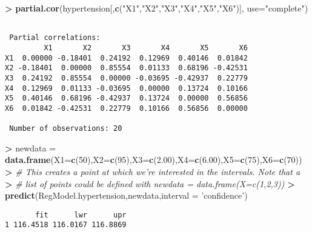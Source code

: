 \documentclass[]{article}
\newenvironment{Shaded}{\begin{snugshade}}{\end{snugshade}}
\newcommand{\KeywordTok}[1]{\textcolor[rgb]{0.13,0.29,0.53}{\textbf{#1}}}
\newcommand{\DataTypeTok}[1]{\textcolor[rgb]{0.13,0.29,0.53}{#1}}
\newcommand{\DecValTok}[1]{\textcolor[rgb]{0.00,0.00,0.81}{#1}}
\newcommand{\FloatTok}[1]{\textcolor[rgb]{0.00,0.00,0.81}{#1}}
\newcommand{\StringTok}[1]{\textcolor[rgb]{0.31,0.60,0.02}{#1}}
\newcommand{\CommentTok}[1]{\textcolor[rgb]{0.56,0.35,0.01}{\textit{#1}}}
\newcommand{\OperatorTok}[1]{\textcolor[rgb]{0.81,0.36,0.00}{\textbf{#1}}}
\newcommand{\ErrorTok}[1]{\textcolor[rgb]{0.64,0.00,0.00}{\textbf{#1}}}
\newcommand{\NormalTok}[1]{#1}
\begin{document}
\begin{Shaded}
\begin{Highlighting}[]
\OperatorTok{>}\StringTok{ }\KeywordTok{partial.cor}\NormalTok{(hypertension[,}\KeywordTok{c}\NormalTok{(}\StringTok{"X1"}\NormalTok{,}\StringTok{"X2"}\NormalTok{,}\StringTok{"X3"}\NormalTok{,}\StringTok{"X4"}\NormalTok{,}\StringTok{"X5"}\NormalTok{,}\StringTok{"X6"}\NormalTok{)], }\DataTypeTok{use=}\StringTok{"complete"}\NormalTok{)}
\end{Highlighting}
\end{Shaded}

\begin{verbatim}

 Partial correlations:
         X1       X2       X3       X4       X5       X6
X1  0.00000 -0.18401  0.24192  0.12969  0.40146  0.01842
X2 -0.18401  0.00000  0.85554  0.01133  0.68196 -0.42531
X3  0.24192  0.85554  0.00000 -0.03695 -0.42937  0.22779
X4  0.12969  0.01133 -0.03695  0.00000  0.13724  0.10166
X5  0.40146  0.68196 -0.42937  0.13724  0.00000  0.56856
X6  0.01842 -0.42531  0.22779  0.10166  0.56856  0.00000

 Number of observations: 20 
\end{verbatim}

\begin{Shaded}
\begin{Highlighting}[]
\OperatorTok{>}\StringTok{ }\NormalTok{newdata =}\StringTok{ }\KeywordTok{data.frame}\NormalTok{(}\DataTypeTok{X1=}\KeywordTok{c}\NormalTok{(}\DecValTok{50}\NormalTok{),}\DataTypeTok{X2=}\KeywordTok{c}\NormalTok{(}\DecValTok{95}\NormalTok{),}\DataTypeTok{X3=}\KeywordTok{c}\NormalTok{(}\FloatTok{2.00}\NormalTok{),}\DataTypeTok{X4=}\KeywordTok{c}\NormalTok{(}\FloatTok{6.00}\NormalTok{),}\DataTypeTok{X5=}\KeywordTok{c}\NormalTok{(}\DecValTok{75}\NormalTok{),}\DataTypeTok{X6=}\KeywordTok{c}\NormalTok{(}\DecValTok{70}\NormalTok{))}
\OperatorTok{>}\StringTok{ }\CommentTok{# This creates a point at which we're interested in the intervals. Note that a }
\ErrorTok{>}\StringTok{ }\CommentTok{# list of points could be defined with newdata = data.frame(X=c(1,2,3))}
\ErrorTok{>}\StringTok{ }\KeywordTok{predict}\NormalTok{(RegModel.hypertension,newdata,}\DataTypeTok{interval =} \StringTok{'confidence'}\NormalTok{)}
\end{Highlighting}
\end{Shaded}

\begin{verbatim}
       fit      lwr      upr
1 116.4518 116.0167 116.8869
\end{verbatim}
\end{document}
